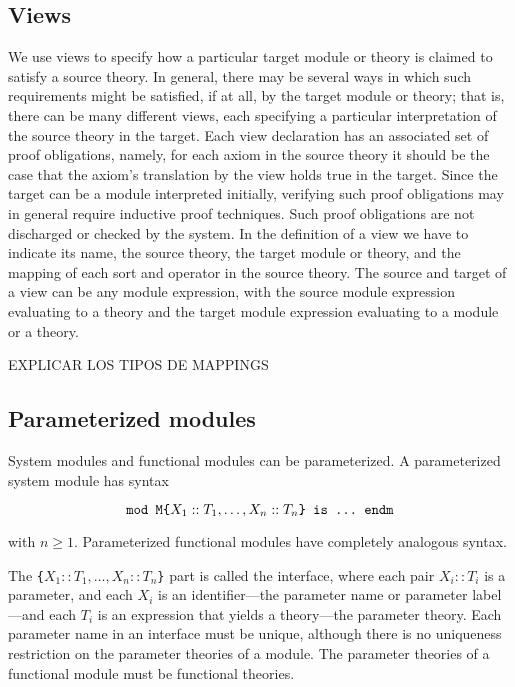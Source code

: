 \subsection{Views}\label{subsec:views}

We use views to specify how a particular target module or theory is claimed
to satisfy a source theory. In general, there may be several ways in which 
such requirements might be satisfied, if at all, by the target module or
theory; that is, there can be many different views, each specifying a
particular interpretation of the source theory in the target. Each
view declaration has an associated set of proof obligations, namely, for
each axiom in the source theory it should be the case that the axiom's
translation by the view holds true in the target. Since the target can
be a module interpreted initially, verifying such proof obligations may
in general require inductive proof techniques. Such proof obligations
are not discharged or checked by the system. 
In the definition of a view we have to indicate its name, the source
theory, the target module or theory, and the mapping of each sort and
operator in the source theory. The source and target of a
view can be any module expression, with the source module expression
evaluating to a theory and the target module expression evaluating to a
module or a theory.

EXPLICAR LOS TIPOS DE MAPPINGS

\subsection{Parameterized modules}\label{subsec:pmod}

System modules and functional modules can be parameterized. A parameterized
system module has syntax

$$
\verb"mod M{" X_1 :: T_1 , \ldots , X_n :: T_n \verb"} is ... endm"
$$

\noindent with $n \geq 1$. Parameterized functional modules have completely
analogous syntax.

The \verb"{"$X_1 :: T_1 , \ldots , X_n :: T_n$\verb"}" part is called the
interface, where each pair $X_i :: T_i$ is a parameter, and each $X_i$ is an
identifier---the parameter name or parameter label---and each $T_i$ is
an expression that yields a theory---the parameter theory. Each parameter
name in an interface must be unique, although there is no uniqueness
restriction on the parameter theories of a module. The parameter theories
of a functional module must be functional theories.

